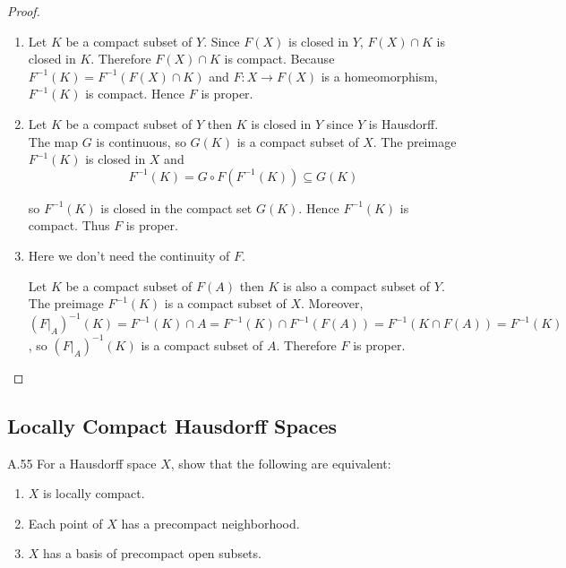 \begin{proof}
\begin{enumerate}[itemsep=0pt,label={(\alph*)}]
              Hence \( {(U_{\alpha})}_{\alpha \in A} \) has a finite subcover, so \( F^{-1}(K) \) is a compact subset of \( X \). Thus \( F \) is proper.
        \item Let \( K \) be a compact subset of \( Y \). Since \( F(X) \) is closed in \( Y \), \( F(X) \cap K \) is closed in \( K \). Therefore \( F(X) \cap K \) is compact. Because \( F^{-1}(K) = F^{-1}(F(X) \cap K) \) and \( F: X \to F(X) \) is a homeomorphism, \( F^{-1}(K) \) is compact. Hence \( F \) is proper.
        \item Let \( K \) be a compact subset of \( Y \) then \( K \) is closed in \( Y \) since \( Y \) is Hausdorff. The map \( G \) is continuous, so \( G(K) \) is a compact subset of \( X \). The preimage \( F^{-1}(K) \) is closed in \( X \) and
              \[
                  F^{-1}(K) = G \circ F(F^{-1}(K)) \subseteq G(K)
              \]

              so \( F^{-1}(K) \) is closed in the compact set \( G(K) \). Hence \( F^{-1}(K) \) is compact. Thus \( F \) is proper.
        \item Here we don't need the continuity of \( F \).

              Let \( K \) be a compact subset of \( F(A) \) then \( K \) is also a compact subset of \( Y \). The preimage \( F^{-1}(K) \) is a compact subset of \( X \). Moreover, \( {(F\vert_{A})}^{-1}(K) = F^{-1}(K) \cap A = F^{-1}(K) \cap F^{-1}(F(A)) = F^{-1}(K \cap F(A)) = F^{-1}(K) \), so \( {(F\vert_{A})}^{-1}(K) \) is a compact subset of \( A \). Therefore \( F \) is proper.
    \end{enumerate}
\end{proof}

\subsection{Locally Compact Hausdorff Spaces}

\begin{exercise}{A.55}
    For a Hausdorff space \( X \), show that the following are equivalent:
    \begin{enumerate}[itemsep=0pt,label={(\alph*)}]
        \item \( X \) is locally compact.
        \item Each point of \( X \) has a precompact neighborhood.
        \item \( X \) has a basis of precompact open subsets.
    \end{enumerate}
\end{exercise}

